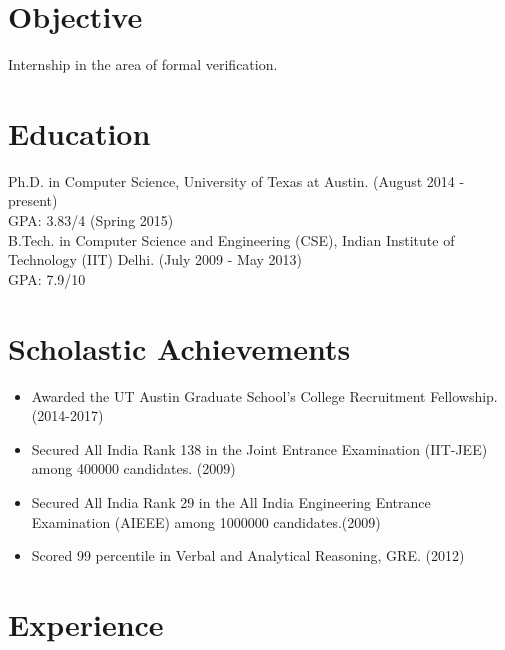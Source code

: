 \documentclass[margin]{res}
\begin{document}
 
 
 
\address{Department of Computer Science \\University of Texas at Austin \\ Austin, TX 78712  \\
        +1 512-952-0104 \\ mihir@cs.utexas.edu }

 
\begin{resume} 
 
\section{Objective} 
Internship in the area of formal verification.

\section{Education} 
Ph.D. in Computer Science, University of Texas at Austin. \hfill (August 2014 - present)\\
GPA: 3.83/4 \hfill (Spring 2015)\\
B.Tech. in Computer Science and Engineering (CSE), Indian Institute of
Technology (IIT) Delhi. \hfill (July 2009 - May 2013)\\
GPA: 7.9/10

\section{Scholastic Achievements}
 \begin{itemize} \itemsep -2pt  %
 \item Awarded the UT Austin Graduate School's College Recruitment
   Fellowship. \hfill (2014-2017)
 \item Secured All India Rank 138 in the Joint Entrance Examination
   (IIT-JEE) among 400000 candidates. \hfill (2009)
 \item Secured All India Rank 29 in the All India Engineering Entrance
   Examination (AIEEE) among 1000000 candidates.\hfill (2009)
 \item Scored 99 percentile in Verbal and Analytical Reasoning,
   GRE. \hfill (2012)
 \end{itemize}
 
\section{Experience}


\end{resume}
\end{document}
